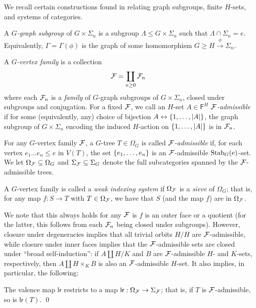 \documentclass[a4paper,10pt]{article}%
\begin{document}
We recall certain constructions found in \cite{Pe17} relating graph subgroups, finite $H$-sets, and systems of categories.
\begin{definition}
  A \textit{$G$-graph subgroup} of $G\times \Sigma_n$ is a subgroup $\Lambda \leq G\times \Sigma_n$ such that $\Lambda \cap \Sigma_n = e$. Equivalently, $\Gamma = \Gamma(\phi)$ is the graph of some homomorphism $G \geq H \xrightarrow{\phi} \Sigma_n$. 
\end{definition}
\begin{definition}
  A \textit{$G$-vertex family} is a collection
  \[
  \mathcal F = \coprod\limits_{n\geq 0}\mathcal F_n
  \]
  where each $\mathcal F_n$ is a \textit{family} of $G$-graph subgroups of $G\times \Sigma_n$, closed under subgroups and conjugation. For a fixed $\mathcal F$, we call an $H$-set $A\in \mathsf F^H$ \textit{$\mathcal F$-admissible} if for some (equivalently, any) choice of bijection $A \leftrightarrow \left\{1,\ldots, |A|\right\}$, the graph subgroup of $G\times \Sigma_n$ encoding the induced $H$-action on $\left\{1,\ldots, |A|\right\}$ is in $\mathcal F_n$. 
\end{definition}
\begin{definition}
  For any $G$-vertex family $\mathcal F$, a $G$-tree $T\in \Omega_G$ is called \textit{$\mathcal F$-admissible} if, for each vertex $e_1\ldots e_n \leq e$ in $V(T)$, the set $\left\{e_1,\ldots, e_n\right\}$ is an $\mathcal F$-admissible $\mathrm{Stab}_G(e)$-set. We let $\Omega_{\mathcal F}\subseteq \Omega_G$ and $\Sigma_{\mathcal F}\subseteq \Sigma_G$ denote the full subcategories spanned by the $\mathcal F$-admissible trees.
\end{definition}
\begin{definition}
  A $G$-vertex family is called a \textit{weak indexing system} if $\Omega_{\mathcal F}$ is a \textit{sieve} of $\Omega_G$; that is, for any map $f:S \to T$ with $T\in \Omega_{\mathcal F}$, we have that $S$ (and the map $f$) are in $\Omega_{\mathcal F}$.
\end{definition}
We note that this always holds for any $\mathcal F$ is $f$ is an outer face or a quotient (for the latter, this follows from each $\mathcal F_n$ being closed under subgroups). However, closure under degeneracies implies that all trivial orbits $H/H$ are $\mathcal F$-admissible, while closure under inner faces implies that the $\mathcal F$-admissible sets are closed under  ``broad self-induction'': if $A \amalg H/K$ and $B$ are $\mathcal F$-admissible $H$- and $K$-sets, respectively, then $A \amalg H\times_K B$ is also an $\mathcal F$-admissible $H$-set. It also implies, in particular, the following:
\begin{lemma}
  \label{WEAK_INDEXING_VALENCE_LEMMA}
  The valence map $\mathsf{lr}$ restricts to a map $\mathsf{lr}: \Omega_{\mathcal F} \to \Sigma_{\mathcal F}$; that is, if $T$ is $\mathcal F$-admissible, so is $\mathsf{lr}(T)$. \qed
\end{lemma}
\end{document}
